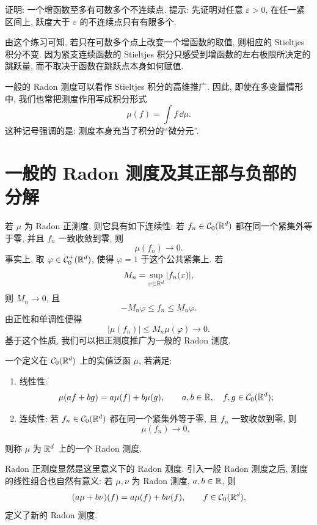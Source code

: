 \begin{exer}
	证明: 一个增函数至多有可数多个不连续点. 提示: 先证明对任意 \(\varepsilon>0\), 在任一紧区间上, 跃度大于 \(\varepsilon\) 的不连续点只有有限多个.
\end{exer}

由这个练习可知, 若只在可数多个点上改变一个增函数的取值, 则相应的 Stieltjes 积分不变. 因为紧支连续函数的 Stieltjes 积分只感受到增函数的左右极限所决定的跳跃量, 而不取决于函数在跳跃点本身如何赋值.

\begin{rem}
	一般的 Radon 测度可以看作 Stieltjes 积分的高维推广. 因此, 即使在多变量情形中, 我们也常把测度作用写成积分形式
	\[
	\mu(f)=\int f\,\dd\mu.
	\]
	这种记号强调的是: 测度本身充当了积分的“微分元”.
\end{rem}

\clearpage

\section{一般的 Radon 测度及其正部与负部的分解}
\label{sec:general-radon-measures-jordan-decomposition}

若 \(\mu\) 为 Radon 正测度, 则它具有如下连续性: 若 \(f_n\in\mathcal{C}_0(\mathbb{R}^d)\) 都在同一个紧集外等于零, 并且 \(f_n\) 一致收敛到零, 则
\[
\mu(f_n)\longrightarrow0.
\]
事实上, 取 \(\varphi\in\mathcal{C}_0^+(\mathbb{R}^d)\), 使得 \(\varphi=1\) 于这个公共紧集上. 若
\[
M_n=\sup_{x\in\mathbb{R}^d}|f_n(x)|,
\]
则 \(M_n\to0\), 且
\[
-M_n\varphi\leq f_n\leq M_n\varphi.
\]
由正性和单调性便得
\[
|\mu(f_n)|\leq M_n\mu(\varphi)\to0.
\]
基于这个性质, 我们可以把正测度推广为一般的 Radon 测度.

\begin{defn}[Radon 测度]
	\label{def:radon-measure-general}
	一个定义在 \(\mathcal{C}_0(\mathbb{R}^d)\) 上的实值泛函 \(\mu\), 若满足:
	\begin{enumerate}
		\item 线性性:
		\[
		\mu(af+bg)=a\mu(f)+b\mu(g),
		\qquad a,b\in\mathbb{R},\quad f,g\in\mathcal{C}_0(\mathbb{R}^d);
		\]
		\item 连续性: 若 \(f_n\in\mathcal{C}_0(\mathbb{R}^d)\) 都在同一个紧集外等于零, 且 \(f_n\) 一致收敛到零, 则
		\[
		\mu(f_n)\to0,
		\]
	\end{enumerate}
	则称 \(\mu\) 为 \(\mathbb{R}^d\) 上的一个 Radon 测度.
\end{defn}

Radon 正测度显然是这里意义下的 Radon 测度. 引入一般 Radon 测度之后, 测度的线性组合也自然有意义: 若 \(\mu,\nu\) 为 Radon 测度, \(a,b\in\mathbb{R}\), 则
\[
(a\mu+b\nu)(f)=a\mu(f)+b\nu(f),
\qquad f\in\mathcal{C}_0(\mathbb{R}^d),
\]
定义了新的 Radon 测度.

